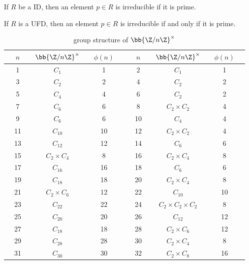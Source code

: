 If $R$ be a ID, then an element $p \in R$ is irreducible if it is prime.

If $R$ is a UFD, then an element $p\in R$ is irreducible if and only if it is prime.


\begin{center}
\begin{longtable}{|ccccccc|ccccccc|}%
\caption{group structure of $\bb{\Z/n\Z}^\times$} \label{tab:group_structure_multiplicative_group_modular_ring}\\ %
\hline
& $n$ & & $\bb{\Z/n\Z}^\times$ & & $\phi(n)$ & & & $n$ & & $\bb{\Z/n\Z}^\times$ & & $\phi(n)$ & \\ %
\hline
& 1 & & $C_1$ & & 1 & & & 2 & & $C_1$ & & 1 & \\%
& 3 & & $C_2$ & & 2 & & & 4 & & $C_2$ & & 2 &  \\
& 5 & & $C_4$ & & 4 & & & 6 & & $C_2$ & & 2 & \\%
& 7 & & $C_6$ & & 6 & & & 8 & & $C_2\times C_2$ & & 4 &  \\
& 9 & & $C_6$ & & 6 & & & 10 & & $C_4$ & & 4 & \\%
& 11 & & $C_{10}$ & & 10 & & & 12 & & $C_2\times C_2$ & & 4 &  \\
& 13 & & $C_{12}$ & & 12 & & & 14 & & $C_6$ & & 6 & \\%
& 15 & & $C_2\times C_4$ & & 8 & & & 16 & & $C_2\times C_4$ & & 8 &  \\
& 17 & & $C_{16}$ & & 16 & & & 18 & & $C_6$ & & 6 & \\%
& 19 & & $C_{18}$ & & 18 & & & 20 & & $C_2\times C_4$ & & 8 &  \\
& 21 & & $C_{2}\times C_6$ & & 12 & & & 22 & & $C_{10}$ & & 10 & \\%
& 23 & & $C_{22}$ & & 22 & & & 24 & & $C_2\times C_2\times C_2$ & & 8 &  \\
& 25 & & $C_{20}$ & & 20 & & & 26 & & $C_{12}$ & & 12 & \\%
& 27 & & $C_{18}$ & & 18 & & & 28 & & $C_2\times C_6$ & & 12 &  \\
& 29 & & $C_{28}$ & & 28 & & & 30 & & $C_2\times C_4$ & & 8 & \\%
& 31 & & $C_{30}$ & & 30 & & & 32 & & $C_2\times C_8$ & & 16 &  \\
\hline%
\end{longtable}
\end{center}


